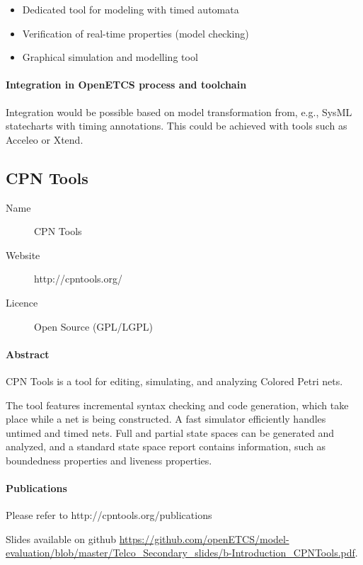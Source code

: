 \begin{itemize}
  \item Dedicated tool for modeling with timed automata
  \item Verification of real-time properties (model checking)
  \item Graphical simulation and modelling tool
\end{itemize}


\paragraph{Integration in OpenETCS process and toolchain}

Integration would be possible based on model transformation from, e.g., SysML statecharts with timing annotations. This could be achieved with tools such as Acceleo or Xtend.

\subsection{CPN Tools}
\label{sec:CPN-Tools}

\begin{description}
\item[Name] CPN Tools
\item[Website] http://cpntools.org/
\item[Licence] Open Source (GPL/LGPL)
\end{description}

\paragraph{Abstract} CPN Tools is a tool for editing, simulating, and analyzing Colored Petri nets.

The tool features incremental syntax checking and code generation, which take place while a net is being constructed. A fast simulator efficiently handles untimed and timed nets. Full and partial state spaces can be generated and analyzed, and a standard state space report contains information, such as boundedness properties and liveness properties.

\paragraph{Publications} Please refer to http://cpntools.org/publications

Slides available on github \url{https://github.com/openETCS/model-evaluation/blob/master/Telco_Secondary_slides/b-Introduction_CPNTools.pdf}.

